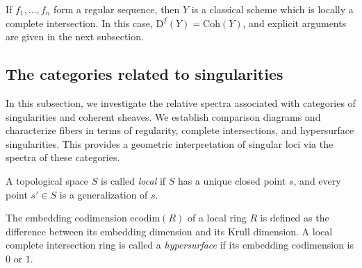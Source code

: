 \documentclass[11pt]{amsart}
\theoremstyle{definition}
\theoremstyle{plain}
\theoremstyle{remark}
\newcommand{\coh}{{\mathrm{Coh}}}
\newcommand{\mo}{\mathrm}
\numberwithin{equation}{section}
\begin{document}
If \(f_1,\ldots,f_n\) form a regular sequence, then \(Y\) is a classical scheme which is locally a complete intersection.  
In this case, \(\mo{D}^f(Y)=\coh(Y)\), and explicit arguments are given in the next subsection.




\subsection{The categories related to singularities}

In this subsection, we investigate the relative spectra associated with categories of singularities and coherent sheaves. 
We establish comparison diagrams and characterize fibers in terms of regularity, complete intersections, and hypersurface singularities. 
This provides a geometric interpretation of singular loci via the spectra of these categories.

A topological space \(S\) is called \emph{local} if \(S\) has a unique closed point \(s\), and every point \(s'\in S\) is a generalization of \(s\).

The embedding codimension \(\mo{ecodim}(R)\) of a local ring \(R\) is defined as the difference between its embedding dimension and its Krull dimension.  
A local complete intersection ring is called a \emph{hypersurface} if its embedding codimension is \(0\) or \(1\).
\end{document}
